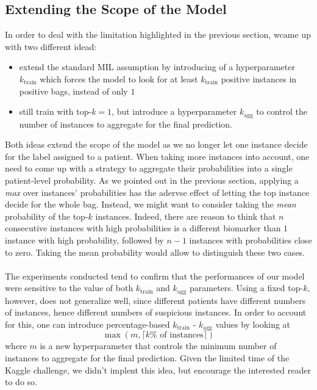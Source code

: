 \documentclass[final]{cvpr}
\begin{document}
	\subsection{Extending  the Scope of the Model} 
	\label{extendedMIL}
	
	In order to deal with the limitation highlighted in the previous section, wcame up with two different idead:
	
	\begin{itemize}
		\item extend the standard MIL assumption by introducing of a hyperparameter $k_{\text{train}}$ which forces the model to look for at least $k_{\text{train}}$ positive instances in positive bags, instead of only $1$
		\item still train with top-$k = 1$, but introduce a hyperparameter $k_{\text{agg}}$ to control the number of instances to aggregate for the final prediction.
	\end{itemize}
	
	\noindent
	Both ideas extend the scope of the model as we no longer let one instance decide for the label assigned to a patient. When taking more instances into account, one need to come up with a strategy to aggregate their probabilities into a single patient-level probability. As we pointed out in the previous section, applying a \textit{max} over instances’ probabilities has the adervse effect of letting the top instance decide for the whole bag. Instead, we might want to consider taking the \textit{mean} probability of the top-$k$ instances. Indeed, there are reason to think that $n$ consecutive instances with high probabilities is a different biomarker than $1$ instance with high probability, followed by $n-1$ instances with probabilities close to zero. Taking the mean probability would allow to distinguish these two cases.\\
	\\
	The experiments conducted tend to confirm that the performances of our model were sensitive to the value of both $k_{\text{train}}$ and $k_{\text{agg}}$ parameters. Using a fixed top-$k$, however, does not generalize well, since different patients have different numbers of instances, hence different numbers of suspicious instances. In order to account for this, one can introduce percentage-based $k_{\text{train}}$ - $k_{\text{agg}}$ values by looking at $$ \max \left(m, \lceil k\% \text{ of instances}\rceil\right) $$ where $m$ is a new hyperparameter that controls the minimum number of instances to aggregate for the final prediction. Given the limited time of the Kaggle challenge, we didn't implent this idea, but encourage the interested reader to do so.
	
\end{document}
